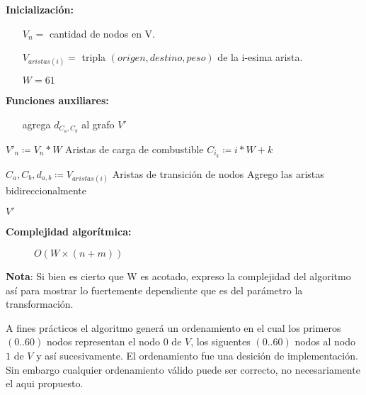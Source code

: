 \documentclass[12pt]{article}
\def\is{\coloneqq}
\begin{document}
\begin{algorithm}[H]
	\caption{$f(V)$}
	\begin{algorithmic}[1]
		\item[\textbf{Inicialización:}]
		\item[] \begin{itemize}
			\item[] $V_n = $ cantidad de nodos en V.
			\item[] $V_{aristas(i)} = $ tripla $(origen, destino, peso)$ de la i-esima arista.
			\item[] $W = 61$
		\end{itemize}
		\item[\textbf{Funciones auxiliares:}]
		\item[] \begin{itemize}
			\item[]  agrega $d_{C_a,C_b}$ al grafo $V'$
		\end{itemize}
		\Statex
		\State $V'_n \is V_n * W$
		\Comment Aristas de carga de combustible
		\State $C_{i_k} \is i * W + k$
		\State {}
		\EndFor
		\EndFor
		\State
		
		\State $C_a,C_b,d_{a,b} \is V_{aristas(i)}$
		\Comment Aristas de transición de nodos
		\Comment Agrego las aristas bidireccionalmente
		\State {}
		\State {}
		\EndIf
		\EndFor
		\EndFor
		
		\State \Return $V'$
		\EndFunction
	\end{algorithmic}
	\begin{description}
		\item[\textbf{Complejidad algorítmica:}] $O(W \times (n + m))$
	\end{description}
\end{algorithm}

\textbf{Nota}: Si bien es cierto que W es acotado, expreso la complejidad del algoritmo así para mostrar lo fuertemente dependiente que es del parámetro la transformación. 

A fines prácticos el algoritmo generá un ordenamiento en el cual los primeros $(0..60)$ nodos representan el nodo $0$ de $V$, los siguentes $(0..60)$ nodos al nodo $1$ de $V$ y así sucesivamente. El ordenamiento fue una desición de implementación. Sin embargo cualquier ordenamiento válido puede ser correcto, no necesariamente el aqui propuesto.
\end{document}
